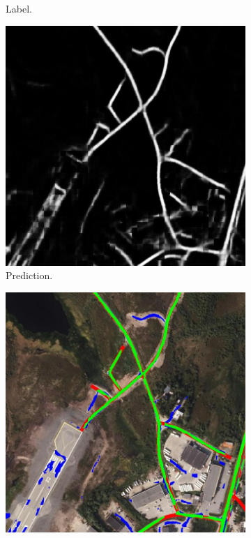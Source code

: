 \begin{figure}[H]
\begin{subfigure}{0.23\textwidth}
\caption{ Label. }
\vspace{0.1cm} %
\end{subfigure}
\hspace*{\fill} %
\begin{subfigure}{0.23\textwidth}
\includegraphics[width=\textwidth]{figs/appendix/pred1205.jpg}
\caption{ Prediction. }
\vspace{0.1cm} %
\end{subfigure}
\hspace*{\fill} %
\begin{subfigure}{0.23\textwidth}
\includegraphics[width=\textwidth]{figs/appendix/hit1205.jpg}

\end{subfigure}
\end{figure}
